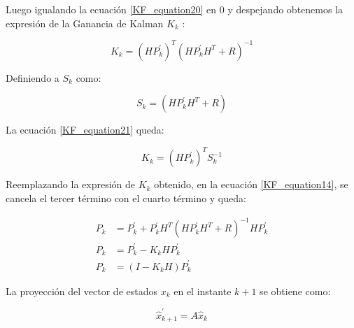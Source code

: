 \documentclass[10pt,a4paper]{article}
\begin{document}
Luego igualando la ecuación \ref{KF_equation20} en 0 y despejando obtenemos la expresión de la Ganancia de Kalman $K_k$ :

\begin{figure}[h!]
	\begin{center}
		\begin{equation}
		K_k = (H P^\prime_k)^T (H P^\prime_k H^T + R)^{-1} 
		\label{KF_equation21}
		\end{equation}	
	\end{center}
\end{figure}

\clearpage

Definiendo a $S_k$ como:

\begin{figure}[h!]
	\begin{center}
		\begin{equation}
		S_k = (H P^\prime_k H^T + R)
		\label{KF_equation22}
		\end{equation}	
	\end{center}
\end{figure}

La ecuación \ref{KF_equation21} queda:

\begin{figure}[h!]
	\begin{center}
		\begin{equation}
		K_k = (H P^\prime_k)^T S_k^{-1} 
		\label{K_Gain}
		\end{equation}	
	\end{center}
\end{figure}

Reemplazando la expresión de $K_k$ obtenido, en la ecuación  \ref{KF_equation14}, se cancela el tercer término con el cuarto término y queda:

\begin{align}
		P_k  &= P^\prime_k + P^\prime_k H^T (H P^\prime_k H^T + R)^{-1} H P^\prime_k \nonumber \\
		P_k  &= P^\prime_k - K_k H P^\prime_k \nonumber\\
		P_k  &= (I - K_k H) P^\prime_k	
		\label{KF_equation23}	
\end{align}

La proyección del vector de estados $x_k$ en el instante $k+1$ se obtiene como:

\begin{figure}[h!]
	\begin{center}
		\begin{equation}
		\hat{x}^\prime_{k+1} = A \hat{x}_k 
		\label{x_k_projection}
		\end{equation}	
	\end{center}
\end{figure}
\end{document}
